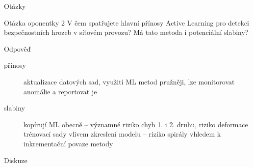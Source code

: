 \documentclass{beamer}
\begin{document}
\begin{frame}{Otázky}
\begin{block}{Otázka oponentky 2}
V čem spatřujete hlavní přínosy Active Learning pro detekci bezpečnostních hrozeb v síťovém provozu? Má tato metoda i potenciální slabiny?
\end{block}

\begin{exampleblock}{Odpověď}
\begin{description}
    \item[přínosy] aktualizace datových sad, využití ML metod pružněji, lze monitorovat anomálie a reportovat je
    \item[slabiny] kopírují ML obecně -- významné riziko chyb 1. i 2. druhu, riziko deformace trénovací sady vlivem zkreslení modelu -- riziko spirály vhledem k inkrementační povaze metody
\end{description}
\end{exampleblock}
\end{frame}

\begin{frame}{}
\centering \huge Diskuze 
\end{frame}
\end{document}
